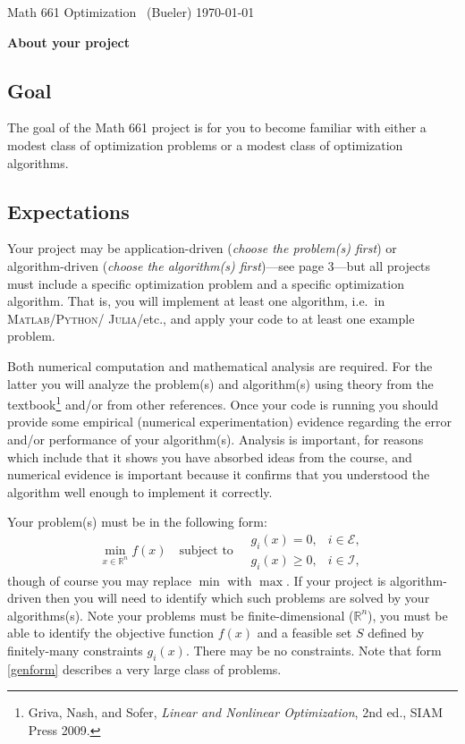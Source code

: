 \documentclass[12pt]{amsart}
\newcommand{\normalspacing}{\renewcommand{\baselinestretch}{1.05}
        \tiny\normalsize}
\newcommand{\RR}{\mathbb{R}}
\newcommand{\Matlab}{\textsc{Matlab}\xspace}
\newcommand{\Python}{\textsc{Python}\xspace}
\newcommand{\Julia}{\textsc{Julia}\xspace}
\begin{document}
\scriptsize \phantom{bob} \vspace{-0.3in}
\noindent Math 661 Optimization \, (Bueler) \hfill  \today
\normalsize\bigskip
\normalspacing

\Large\centerline{\textbf{About your project}}
\normalsize

\bigskip\medskip
\thispagestyle{empty}
\normalspacing

\subsection*{Goal}  The goal of the Math 661 project is for you to become familiar with either a modest class of optimization problems or a modest class of optimization algorithms.

\subsection*{Expectations}  Your project may be application-driven (\emph{choose the problem(s) first}) or algorithm-driven (\emph{choose the algorithm(s) first})---see page 3---but all projects must include a specific optimization problem and a specific optimization algorithm.  That is, you will implement at least one algorithm, i.e.~in \Matlab/\Python/ \Julia/etc., and apply your code to at least one example problem.

Both numerical computation and mathematical analysis are required.  For the latter you will analyze the problem(s) and algorithm(s) using theory from the textbook\footnote{Griva, Nash, and Sofer, \emph{Linear and Nonlinear Optimization}, 2nd ed., SIAM Press 2009.} and/or from other references.  Once your code is running you should provide some empirical (numerical experimentation) evidence regarding the error and/or performance of your algorithm(s).  Analysis is important, for reasons which include that it shows you have absorbed ideas from the course, and numerical evidence is important because it confirms that you understood the algorithm well enough to implement it correctly.

Your problem(s) must be in the following form:
\begin{equation}
\min_{x\in \RR^n} f(x) \quad \text{subject to} \quad \begin{matrix}
                                                      g_i(x) = 0, & i \in \mathcal{E}, \\
                                                      g_i(x) \ge 0, & i \in \mathcal{I},
                                                      \end{matrix}  \label{genform}
\end{equation}
though of course you may replace $\min$ with $\max$.  If your project is algorithm-driven then you will need to identify which such problems are solved by your algorithms(s).  Note your problems must be finite-dimensional ($\RR^n$), you must be able to identify the objective function $f(x)$ and a feasible set $S$ defined by finitely-many constraints $g_i(x)$.  There may be no constraints.  Note that form \eqref{genform} describes a very large class of problems.
\end{document}
